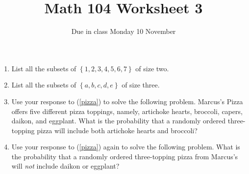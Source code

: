 \documentclass[12pt]{article}
\author{}\date{Due in class Monday 10 November}
\title{Math 104 Worksheet 3}\author{}
\begin{document}
\maketitle
\pagestyle{empty}
\begin{enumerate}
\item List all the subsets of $\left\{1,2,3,4,5,6,7\right\}$
of size two.
\item\label{pizza}
List all the subsets of $\left\{a,b,c,d,e\right\}$ of size three.
\item Use your response to (\ref{pizza}) to solve the following problem.
Marcus's Pizza offers five different pizza toppings,
namely, artichoke hearts, broccoli, capers, daikon, and eggplant.
What is the probability that a randomly ordered three-topping pizza
will include both artichoke hearts and broccoli?
\item Use your response to (\ref{pizza}) again to solve the following problem.
What is the probability that a randomly ordered three-topping pizza from Marcus's
will {\em not} include daikon or eggplant?
\end{enumerate}
\end{document}
